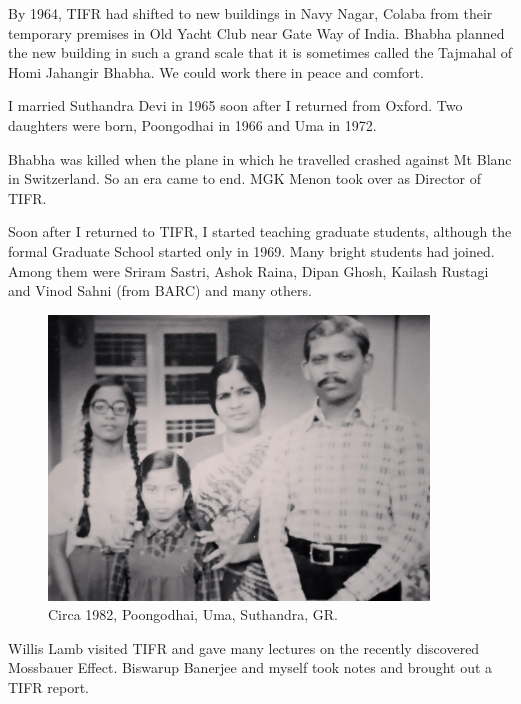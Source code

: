 By 1964, TIFR had shifted to new buildings in Navy Nagar, Colaba from 
their temporary premises in Old Yacht Club near Gate Way of India. 
Bhabha planned the new building in such a grand scale that it is 
sometimes called the Tajmahal of Homi Jahangir Bhabha. We could work 
there in peace and comfort.

I married Suthandra Devi in 1965 soon after I 
returned from Oxford. Two daughters were born, Poongodhai in 1966 and 
Uma in 1972.

Bhabha was killed when the plane in which he travelled crashed against 
Mt Blanc in Switzerland. So an era came to end. MGK Menon took over as 
Director of TIFR.

Soon after I returned to TIFR, I started teaching graduate students, 
although the formal Graduate School started only in 1969. Many bright 
students had joined. Among them were Sriram Sastri, Ashok Raina, Dipan 
Ghosh, Kailash Rustagi and Vinod Sahni (from BARC) and many others.
\eject

\begin{figure}[H]
\centering
\includegraphics[width=0.9\textwidth]{images/Rajaji-03.jpg}
\caption{ Circa 1982, Poongodhai, Uma, Suthandra, GR.}
\end{figure}

Willis Lamb visited TIFR and gave many lectures on the recently 
discovered Mossbauer Effect. Biswarup Banerjee and myself took notes and 
brought out a TIFR report.
                 
